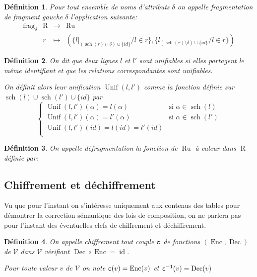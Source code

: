 \documentclass[french]{article}
\DeclareMathOperator{\frag}{frag}
\DeclareMathOperator{\id}{id}
\DeclareMathOperator{\R}{R}
\DeclareMathOperator{\s}{sch}
\DeclareMathOperator{\ru}{Ru}
\DeclareMathOperator{\uni}{Unif}
\DeclareMathOperator{\enc}{Enc}
\DeclareMathOperator{\dec}{Dec}
\newcommand\typeT[1]{\text{\ttfamily #1}}
\newcommand{\fragDelta}{\frag_{\delta}}
\newcommand{\val}{\mathcal{V}}
\newcommand{\cy}[1]{\typeT{c}(#1)}
\newcommand{\dc}[1]{\typeT{c}^{-1}(#1)}
\newcommand{\cip}{\cup \{id\}}
\newtheorem{defi}{Définition}
\begin{document}
\begin{defi}
	Pour tout ensemble de noms d'attributs $\delta$
	on appelle \emph{fragmentation de fragment gauche $\delta$}
	l'application suivante:
	$$
	\begin{array}{llcl}
	\fragDelta 	& \R & \rightarrow & \ru \\
				& r  & \mapsto & (\{l|_{(\s(r)\cap \delta) \cup \{id\}}/ l \in r \}, 
						\{ l_{(\s(r) \setminus \delta)\cup \{id\}} / l \in r \})
	\end{array}
	$$
\end{defi}

\begin{defi}
	On dit que deux lignes $l$ et $l'$ sont \emph{unifiables}
	si elles partagent le même identifiant
	et que les relations correspondantes sont unifiables.
	
	On définit alors leur unification $\uni(l, l')$ comme la fonction
	définie sur $\s(l) \cup \s(l') \cip$ par
		$$
		\left\lbrace
		\begin{array}{ll}
		\uni(l, l')(\alpha)  = l(\alpha) & \text{si $\alpha \in \s(l) $} \\
		\uni(l, l')(\alpha)  = l'(\alpha) & \text{si $\alpha \in \s(l') $} \\
		\uni(l, l')(id)  = l(id) = l'(id) &  \\
		\end{array}
		\right.
		$$
\end{defi}

\begin{defi}
	On appelle \emph{défragmentation} la fonction
	de $\ru$ à valeur dans $\R$ définie par:
	
\end{defi}

\subsection*{Chiffrement et déchiffrement}
Vu que pour l'instant on s'intéresse uniquement aux contenus des 
tables pour démontrer la correction sémantique des lois
de composition, on ne parlera pas pour l'instant
des éventuelles clefs de chiffrement et déchiffrement.

\begin{defi}
	On appelle \emph{chiffrement} tout couple $\typeT{c}$ de fonctions $(\enc, \dec)$
	de $\val$ dans $\val$
	vérifiant
	$\displaystyle \dec \circ \enc = \id$.
	
	Pour toute valeur $v$ de $\val$
	on note $\cy{v} = \enc(v)$
	et $\dc{v} = \dec(v)$
\end{defi}
\end{document}
